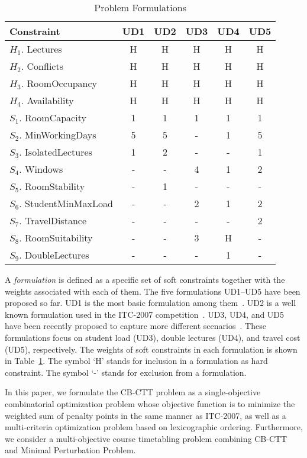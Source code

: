 \begin{table}
\centering
\caption{Problem Formulations}
\label{table:problem_formulations}
\begin{tabular}[t]{l|ccccc}\hline
Constraint & UD1 & UD2 & UD3 & UD4 & UD5\\\hline
$H_1$. Lectures &  
H &  H &  H &  H & H\\
$H_2$. Conflicts &  
H &  H &  H &  H & H\\
$H_3$. RoomOccupancy &  
H &  H &  H &  H & H\\
$H_4$. Availability &  
H &  H &  H &  H & H\\
$S_1$. RoomCapacity &  
1 & 1 & 1 & 1  & 1 \\
$S_2$. MinWorkingDays &  
5 &  5 & - & 1 & 5 \\
$S_3$. IsolatedLectures &  
1 & 2 & - & - & 1 \\
$S_4$. Windows &  
- & - & 4 & 1 & 2\\
$S_5$. RoomStability &  
- & 1 & - & - & -\\
$S_6$. StudentMinMaxLoad &  
- & - & 2 & 1 & 2\\
$S_7$. TravelDistance &  
- & - & - & - & 2\\
$S_8$. RoomSuitability &  
- & - & 3 & H & -\\
$S_9$. DoubleLectures &  
- & - & - & 1 & -\\\hline
\end{tabular}
\end{table}

A \textit{formulation} is defined as a specific set of soft constraints
together with the weights associated with each of them.
%
The five formulations UD1--UD5 have been proposed so far.
UD1 is the most basic formulation among them~\citep{DBLP:conf/patat/GasperoS02}.
UD2 is a well known formulation used in the ITC-2007 competition~\citep{GasperoMS/ITC2007}.
UD3, UD4, and UD5 have been recently proposed
to capture more different scenarios~\citep{DBLP:journals/anor/BonuttiCGS12}.
These formulations focus on 
student load (UD3), 
double lectures (UD4), and
travel cost (UD5), respectively.
%
The weights of soft constraints in each formulation is shown in 
Table~\ref{table:problem_formulations}.
The symbol `H' stands for inclusion in a formulation as hard constraint.
The symbol `-' stands for exclusion from a formulation.

In this paper, we formulate the CB-CTT problem as a single-objective
combinatorial optimization problem whose objective function is to
minimize the weighted sum of penalty points in the same manner as
ITC-2007, 
as well as a multi-criteria optimization problem based on lexicographic ordering.
Furthermore, we consider a multi-objective course timetabling problem
combining CB-CTT and Minimal Perturbation Problem.


